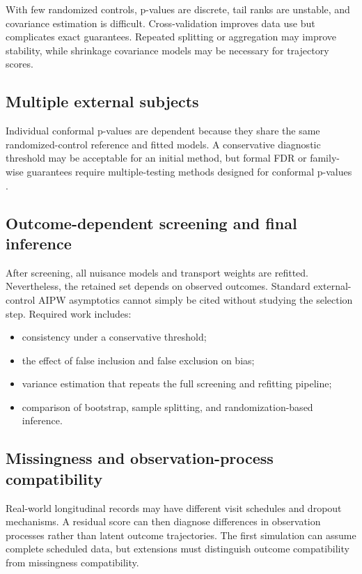 \documentclass[11pt]{article}
\begin{document}
With few randomized controls, p-values are discrete, tail ranks are unstable, and covariance estimation is difficult. Cross-validation improves data use but complicates exact guarantees. Repeated splitting or aggregation may improve stability, while shrinkage covariance models may be necessary for trajectory scores.

\subsection{Multiple external subjects}

Individual conformal p-values are dependent because they share the same randomized-control reference and fitted models. A conservative diagnostic threshold may be acceptable for an initial method, but formal FDR or family-wise guarantees require multiple-testing methods designed for conformal p-values \citep{bates2023outliers,jin2026weighted}.

\subsection{Outcome-dependent screening and final inference}

After screening, all nuisance models and transport weights are refitted. Nevertheless, the retained set depends on observed outcomes. Standard external-control AIPW asymptotics cannot simply be cited without studying the selection step. Required work includes:
\begin{itemize}
    \item consistency under a conservative threshold;
    \item the effect of false inclusion and false exclusion on bias;
    \item variance estimation that repeats the full screening and refitting pipeline;
    \item comparison of bootstrap, sample splitting, and randomization-based inference.
\end{itemize}

\subsection{Missingness and observation-process compatibility}

Real-world longitudinal records may have different visit schedules and dropout mechanisms. A residual score can then diagnose differences in observation processes rather than latent outcome trajectories. The first simulation can assume complete scheduled data, but extensions must distinguish outcome compatibility from missingness compatibility.
\end{document}
